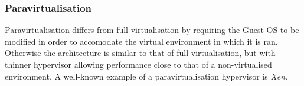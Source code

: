 \subsubsection{Paravirtualisation}

Paravirtualisation differs from full virtualisation by requiring the Guest OS to be modified in order to accomodate the virtual environment in which it is ran. Otherwise the architecture is similar to that of full virtualisation, but with thinner hypervisor allowing performance close to that of a non-virtualised environment. A well-known example of a paravirtualisation hypervisor is \textit{Xen}\cite{xen}.



